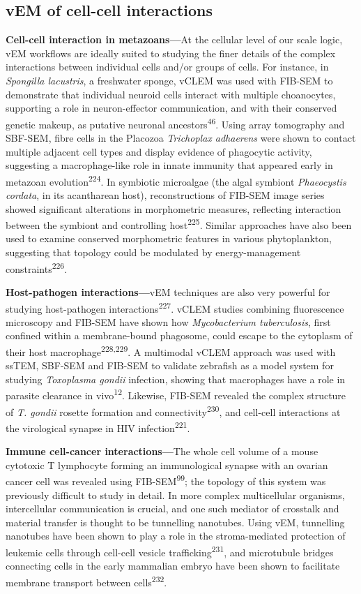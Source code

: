 \documentclass{article}
\begin{document}
\subsection*{vEM of cell-cell interactions}

\textbf{Cell-cell interaction in metazoans—}At the cellular level of our scale logic, vEM workflows are ideally suited to studying the finer details of the complex interactions between individual cells and/or groups of cells. For instance, in \emph{Spongilla lacustris}, a freshwater sponge, vCLEM was used with FIB-SEM to demonstrate that individual neuroid cells interact with multiple choanocytes, supporting a role in neuron-effector communication, and with their conserved genetic makeup, as putative neuronal ancestors\textsuperscript{46}. Using array tomography and SBF-SEM, fibre cells in the Placozoa \emph{Trichoplax adhaerens} were shown to contact multiple adjacent cell types and display evidence of phagocytic activity, suggesting a macrophage-like role in innate immunity that appeared early in metazoan evolution\textsuperscript{224}. In symbiotic microalgae (the algal symbiont \emph{Phaeocystis cordata}, in its acantharean host), reconstructions of FIB-SEM image series showed significant alterations in morphometric measures, reflecting interaction between the symbiont and controlling host\textsuperscript{225}. Similar approaches have also been used to examine conserved morphometric features in various phytoplankton, suggesting that topology could be modulated by energy-management constraints\textsuperscript{226}.

\textbf{Host-pathogen interactions—}vEM techniques are also very powerful for studying host-pathogen interactions\textsuperscript{227}. vCLEM studies combining fluorescence microscopy and FIB-SEM have shown how \emph{Mycobacterium tuberculosis}, first confined within a membrane-bound phagosome, could escape to the cytoplasm of their host macrophage\textsuperscript{228,229}. A multimodal vCLEM approach was used with ssTEM, SBF-SEM and FIB-SEM to validate zebrafish as a model system for studying \emph{Toxoplasma gondii} infection, showing that macrophages have a role in parasite clearance in vivo\textsuperscript{12}. Likewise, FIB-SEM revealed the complex structure of \emph{T. gondii} rosette formation and connectivity\textsuperscript{230}, and cell-cell interactions at the virological synapse in HIV infection\textsuperscript{221}.

\textbf{Immune cell-cancer interactions—}The whole cell volume of a mouse cytotoxic T lymphocyte forming an immunological synapse with an ovarian cancer cell was revealed using FIB-SEM\textsuperscript{99}; the topology of this system was previously difficult to study in detail. In more complex multicellular organisms, intercellular communication is crucial, and one such mediator of crosstalk and material transfer is thought to be tunnelling nanotubes. Using vEM, tunnelling nanotubes have been shown to play a role in the stroma-mediated protection of leukemic cells through cell-cell vesicle trafficking\textsuperscript{231}, and microtubule bridges connecting cells in the early mammalian embryo have been shown to facilitate membrane transport between cells\textsuperscript{232}.
\end{document}
